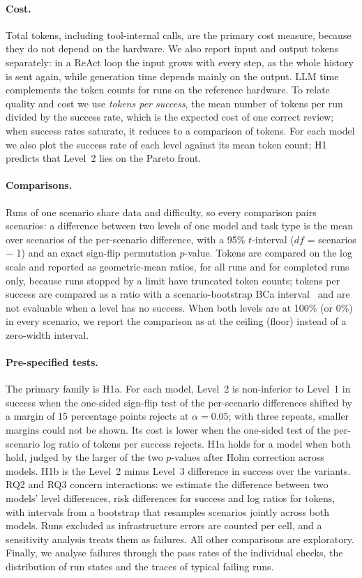 \paragraph{Cost.} Total tokens, including tool-internal calls, are the primary cost measure, because they do not depend on the hardware. We also report input and output tokens separately: in a ReAct loop the input grows with every step, as the whole history is sent again, while generation time depends mainly on the output. LLM time complements the token counts for runs on the reference hardware. To relate quality and cost we use \emph{tokens per success}, the mean number of tokens per run divided by the success rate, which is the expected cost of one correct review; when success rates saturate, it reduces to a comparison of tokens. For each model we also plot the success rate of each level against its mean token count; H1 predicts that Level~2 lies on the Pareto front.

\paragraph{Comparisons.} Runs of one scenario share data and difficulty, so every comparison pairs scenarios: a difference between two levels of one model and task type is the mean over scenarios of the per-scenario difference, with a 95\% $t$-interval ($\mathit{df}$ = scenarios $-$ 1) and an exact sign-flip permutation $p$-value. Tokens are compared on the log scale and reported as geometric-mean ratios, for all runs and for completed runs only, because runs stopped by a limit have truncated token counts; tokens per success are compared as a ratio with a scenario-bootstrap BCa interval~\citep{efron1993bootstrap} and are not evaluable when a level has no success. When both levels are at 100\% (or 0\%) in every scenario, we report the comparison as at the ceiling (floor) instead of a zero-width interval.

\paragraph{Pre-specified tests.} The primary family is H1a. For each model, Level~2 is non-inferior to Level~1 in success when the one-sided sign-flip test of the per-scenario differences shifted by a margin of 15 percentage points rejects at $\alpha = 0.05$; with three repeats, smaller margins could not be shown. Its cost is lower when the one-sided test of the per-scenario log ratio of tokens per success rejects. H1a holds for a model when both hold, judged by the larger of the two $p$-values after Holm correction across models. H1b is the Level~2 minus Level~3 difference in success over the variants. RQ2 and RQ3 concern interactions: we estimate the difference between two models' level differences, risk differences for success and log ratios for tokens, with intervals from a bootstrap that resamples scenarios jointly across both models. Runs excluded as infrastructure errors are counted per cell, and a sensitivity analysis treats them as failures. All other comparisons are exploratory. Finally, we analyse failures through the pass rates of the individual checks, the distribution of run states and the traces of typical failing runs.

